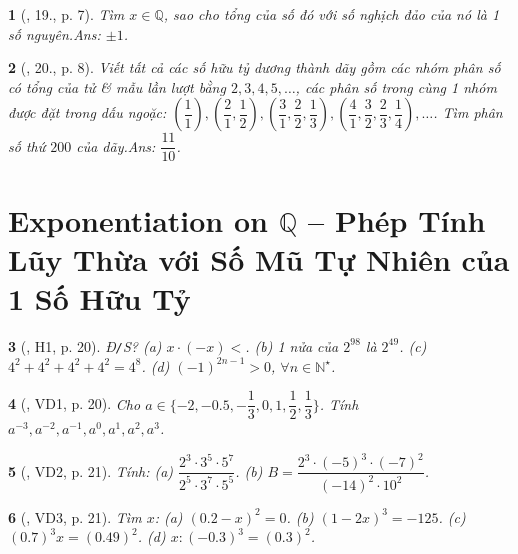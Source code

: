 \documentclass{article}
\newtheorem{baitoan}{}
\begin{document}
\begin{baitoan}[\cite{Binh_Toan_7_tap_1}, 19., p. 7]
	Tìm $x\in\mathbb{Q}$, sao cho tổng của số đó với số nghịch đảo của nó là 1 số nguyên.\hfill{\sf Ans: $\pm 1$.}
\end{baitoan}

\begin{baitoan}[\cite{Binh_Toan_7_tap_1}, 20., p. 8]
	Viết tất cả các số hữu tỷ dương  thành dãy gồm các nhóm phân số có tổng của tử \& mẫu lần lượt bằng $2,3,4,5,\ldots$, các phân số trong cùng 1 nhóm được đặt trong dấu ngoặc: $\left(\dfrac{1}{1}\right),\left(\dfrac{2}{1},\dfrac{1}{2}\right),\left(\dfrac{3}{1},\dfrac{2}{2},\dfrac{1}{3}\right),\left(\dfrac{4}{1},\dfrac{3}{2},\dfrac{2}{3},\dfrac{1}{4}\right),\ldots$. Tìm phân số thứ $200$ của dãy.\hfill{\sf Ans: $\dfrac{11}{10}$.}
\end{baitoan}


\section{Exponentiation on $\mathbb{Q}$ -- Phép Tính Lũy Thừa với Số Mũ Tự Nhiên của 1 Số Hữu Tỷ}

\begin{baitoan}[\cite{Binh_boi_duong_Toan_7_tap_1}, H1, p. 20]
	{\rm Đ{\tt/}S?} (a) $x\cdot(-x) < $. (b) 1 nửa của $2^{98}$ là $2^{49}$. (c) $4^2 + 4^2 + 4^2 + 4^2 = 4^8$. (d) $(-1)^{2n - 1} > 0$, $\forall n\in\mathbb{N}^\star$.
\end{baitoan}

\begin{baitoan}[\cite{Binh_boi_duong_Toan_7_tap_1}, VD1, p. 20]
	Cho $a\in\{-2,-0.5,-\dfrac{1}{3},0,1,\dfrac{1}{2},\dfrac{1}{3}\}$. Tính $a^{-3},a^{-2},a^{-1},a^0,a^1,a^2,a^3$.
\end{baitoan}

\begin{baitoan}[\cite{Binh_boi_duong_Toan_7_tap_1}, VD2, p. 21]
	Tính: (a) $\dfrac{2^3\cdot3^5\cdot5^7}{2^5\cdot3^7\cdot5^5}$. (b) $B = \dfrac{2^3\cdot(-5)^3\cdot(-7)^2}{(-14)^2\cdot10^2}$.
\end{baitoan}

\begin{baitoan}[\cite{Binh_boi_duong_Toan_7_tap_1}, VD3, p. 21]
	Tìm $x$: (a) $(0.2 - x)^2 = 0$. (b) $(1 - 2x)^3 = -125$. (c) $(0.7)^3x = (0.49)^2$. (d) $x:(-0.3)^3 = (0.3)^2$.
\end{baitoan}
\end{document}
